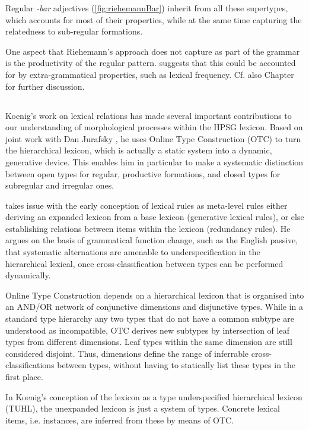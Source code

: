 \documentclass[output=paper
                ,modfonts
                ,nonflat
	        ,collection
	        ,collectionchapter
	        ,collectiontoclongg
 	        ,biblatex
                ,babelshorthands
                ,newtxmath
                ,draftmode
                ,colorlinks, citecolor=brown
] {langscibook}
\begin{document}
{Regular \textit{-bar} adjectives (\ref{fig:riehemannBar}) inherit from all these supertypes, which
accounts for most of their properties, while at the same time
capturing the relatedness to sub-regular formations. 


One aspect that Riehemann's approach does not capture as part of the
grammar is the productivity of the regular
pattern. \citet{Riehemann98} suggests that this could be accounted for
by extra-grammatical properties, such as lexical frequency. Cf. also
Chapter~ for further discussion.

\subsection{\citet{Koenig99}}

Koenig's work on lexical relations has made several important
contributions to our understanding of morphological processes within
the HPSG lexicon. Based on joint work with Dan Jurafsky
\citep{Koenig94}, he uses Online Type Construction (OTC) to turn the
hierarchical lexicon, which is actually a static system into a
dynamic, generative device. This enables him in particular to make a
systematic distinction between open types for regular, productive
formations, and closed types for subregular and irregular ones.

\citet{Koenig99} takes issue with the early conception of lexical
rules as meta-level rules either deriving an expanded lexicon from a
base lexicon (generative lexical rules), or else establishing
relations between items within the lexicon (redundancy rules). He
argues on the basis of grammatical function change, such as the
English passive, that systematic alternations are amenable to
underspecification in the hierarchical lexical,  once
cross-classification between types can be performed dynamically.

Online Type Construction depends on a hierarchical lexicon that is
organised into an  AND/OR network of conjunctive dimensions and
disjunctive types. While in a standard type hierarchy any two types
that do not have a common subtype are understood as incompatible, OTC
derives new subtypes by intersection of leaf types from different
dimensions. Leaf types within the same dimension are still considered
disjoint. Thus, dimensions define the range of inferrable
cross-classifications between types, without having to statically list
these types in the first place.

In Koenig's conception of the lexicon as a type underspecified
hierarchical lexicon (TUHL), the unexpanded lexicon is just a system of
types. Concrete lexical items, i.e. instances, are inferred from these
by means of OTC. 

}
\end{document}
